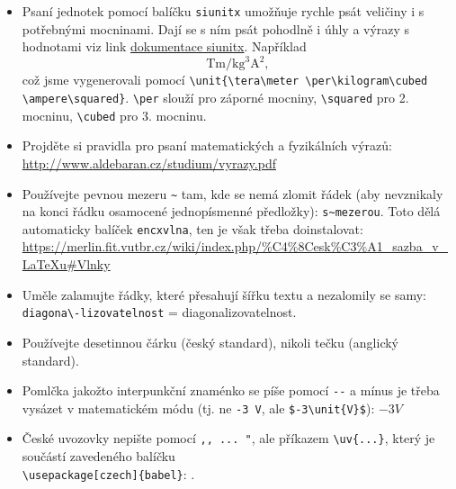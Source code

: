 \begin{itemize}
	\item Psaní jednotek pomocí balíčku \verb|siunitx| umožňuje rychle psát veličiny i s potřebnými mocninami. Dají se s ním psát pohodlně i úhly a výrazy s hodnotami viz link \href{https://texdoc.org/serve/siunitx/0}{dokumentace siunitx}. Například $$\unit{\tera\meter \per\kilogram\cubed \ampere\squared},$$
	což jsme vygenerovali pomocí \verb|\unit{\tera\meter \per\kilogram\cubed \ampere\squared}|. \verb|\per| slouží pro záporné mocniny, \verb|\squared| pro 2. mocninu, \verb|\cubed| pro 3. mocninu.
	
	\item Projděte si pravidla pro psaní matematických a fyzikálních výrazů: 	\url{http://www.aldebaran.cz/studium/vyrazy.pdf}
	\item Používejte pevnou mezeru \verb|~| tam, kde se nemá zlomit řádek (aby nevznikaly na konci řádku osamocené jednopísmenné předložky): \verb|s~mezerou|. 
	Toto dělá automaticky balíček \verb|encxvlna|, ten je však třeba doinstalovat: \url{https://merlin.fit.vutbr.cz/wiki/index.php/%C4%8Cesk%C3%A1_sazba_v_LaTeXu#Vlnky}
	
	\item Uměle zalamujte řádky, které přesahují šířku textu a nezalomily se samy: \verb|diagona\-lizovatelnost| = diagona\-lizovatelnost.
	
	\item Používejte desetinnou čárku (český standard), nikoli tečku (anglický standard).
	
	\item Pomlčka jakožto interpunkční znaménko se píše pomocí \verb|--| a mínus je třeba vysázet v matematickém módu (tj. ne \verb|-3 V|, ale \verb|$-3\unit{V}$|): $-3\unit{V}$ 
	
	\item České uvozovky nepište pomocí \verb|,, ... "|, ale příkazem \verb|\uv{...}|, který je součástí zavedeného balíčku \\ \verb|\usepackage[czech]{babel}|: .
\end{itemize}	



